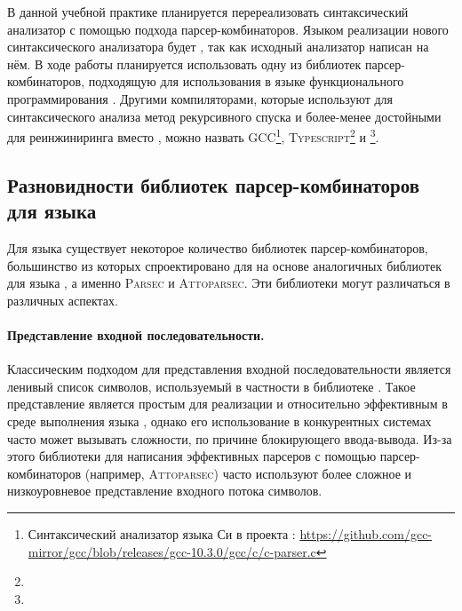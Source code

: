 В данной учебной практике планируется перереализовать синтаксический анализатор \ReScript{} с помощью подхода парсер-комбинаторов. Языком реализации нового синтаксического анализатора будет \ReScript{}, так как исходный анализатор написан на нём. В ходе работы планируется использовать одну из библиотек парсер-комбинаторов, подходящую для использования в языке функционального программирования \ReScript{}. 
Другими компиляторами, которые используют для синтаксического анализа метод рекурсивного спуска и более-менее достойными для реинжиниринга вместо \ReScript{}, можно назвать \textsc{GCC}\footnote{Синтаксический анализатор языка Си в проекта \GCC: \url{https://github.com/gcc-mirror/gcc/blob/releases/gcc-10.3.0/gcc/c/c-parser.c}}, 
\textsc{Typescript}\footnote{} и \Kotlin{}\footnote{}.


\subsection{Разновидности библиотек парсер-комбинаторов для языка \OCaml{}}

Для языка \OCaml{} существует некоторое количество библиотек парсер-комбинаторов, большинство из которых спроектировано для 
на основе аналогичных библиотек для языка \Haskell, а именно \textsc{Parsec} и \textsc{Attoparsec}. Эти библиотеки могут различаться в различных аспектах. 



\paragraph{Представление входной последовательности.} Классическим подходом для представления входной последовательности является ленивый список символов, используемый в частности в библиотеке \Parsec{}. Такое представление является простым для реализации и относительно эффективным в среде выполнения языка \Haskell{}, однако его использование в конкурентных системах часто может вызывать сложности, по причине блокирующего ввода-вывода. Из-за этого библиотеки для написания эффективных парсеров с помощью парсер-комбинаторов (например, \textsc{Attoparsec}) часто используют более сложное и низкоуровневое представление входного потока символов.


